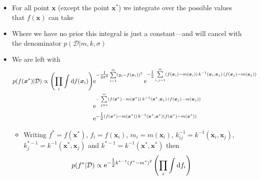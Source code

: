 \documentclass[11pt]{article}
\newcommand{\tr}{\textsf{T}}
\newcommand{\e}[1]{{\rm e}^{#1}}
\newcommand{\dd}{\mathrm{d}}
\begin{document}
\begin{itemize}
\begin{itemize}
\begin{itemize}
$$         \frac{1}{\sqrt{|2\,\pi\, \mat{C}|}} \e{-\tfrac{1}{2}
         (\bm{x}-\bm{\mu})^\tr \mat{C}^{-1}\, (\bm{x}-\bm{\mu})} $$
and you integrate over \(x_i\) (marginalise it out) then
$$ \int_{-\infty}^{\infty} \mathcal{N}(\bm{x}|
         \bm{\mu},\mat{C}) \, \dd x_i = \mathcal{N}(\hat{\bm{x}}|
         \hat{\bm{\mu}},\hat{\mat{C}}) $$
where \(\hat{\bm{x}}\) and \(\hat{\bm{\mu}}\) are identical to
\(\bm{x}\) and \(\bm{\mu}\) except with their \(i^{th}\) component
removed and \(\hat{\mat{C}}\) is identical to \(\mat{C}\) except
with the \(i^{th}\) row and column removed
\item Intuitively this seems very natural (if \(x_i\) can take any value it
doesn't change the mean or covariance between other random
variables )
\item You can prove this algebraically but it is not a trivial calculation
\item Because of this for a Gaussian Process we only care about
those set of points where we have data values
\end{itemize}
\item For all point \(\bm{x}\) (except the point \(\bm{x}^*\)) we
integrate over the possible values that \(f(\bm{x})\) can take
\item Where we have no prior this integral is just a constant---and
will cancel with the denominator \(p(\mathcal{D}|m,k,\sigma)\)
\item We are left with
\begin{align*}
p(f(\bm{x}^*)|\mathcal{D}) \propto \left(\prod_i \int \dd
f(\bm{x}_i)\right) &
\e{- \tfrac{1}{2\sigma^2} \sum\limits_{i=1}^m (y_i-f(\bm{x}_i))^2 } 
\, \e{-\tfrac{1}{2}\sum\limits_{i,j=1}^m
(f(\bm{x}_i)-m(\bm{x}_i))\, k^{-1}(\bm{x}_i,\bm{x}_j)  \,
(f(\bm{x}_j)-m(\bm{x}_j))}\\
& \e{-\sum\limits_{j=1}^m
(f(\bm{x}^*)-m(\bm{x}^*))\, k^{-1}(\bm{x}^*,\bm{x}_j)  \,
(f(\bm{x}_j)-m(\bm{x}_j)) } \\
& \e{ - \tfrac{1}{2} (f(\bm{x}^*)-m(\bm{x}^*))\, k^{-1}(\bm{x}^*,\bm{x}^*)
(f(\bm{x}^*)-m(\bm{x}^*))}
\end{align*}
\begin{itemize}
\item Writing \(f^*=f(\bm{x}^*)\), \(f_i=f(\bm{x}_i)\), \(m_i=m(\bm{x}_i)\),
\(k^{-1}_{ij} =k^{-1}(\bm{x}_i,\bm{x}_j)\),
\(k^{*-1}_j=k^{-1}(\bm{x}^*,\bm{x}_j)\) and
\(k^{*-1}=k^{-1}(\bm{x}^*,\bm{x}^*)\)  then
\begin{align*}
p(f^*|\mathcal{D}) \propto  \e{-\tfrac{1}{2} k^{*-1}(f^*-m^*)^2} 
 \left(\prod_i \int \dd f_i\right) &

\end{align*}
\end{itemize}
\end{itemize}
\end{itemize}
\end{document}
